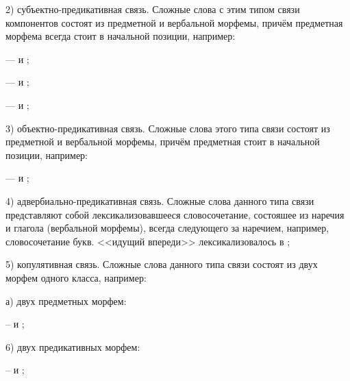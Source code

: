 2) субъектно-предикативная связь. Сложные слова с этим типом связи компонентов состоят из предметной и вербальной морфемы, причём предметная морфема всегда стоит в начальной позиции, например:
\begin{prfsample}
    \item {} ---  и ;
    \item {} ---  и ;
    \item {} ---  и ;
\end{prfsample}

3) объектно-предикативная связь. Сложные слова этого типа связи состоят из предметной и вербальной морфемы, причём предметная стоит в начальной позиции, например:
\begin{prfsample}
    \item {} ---  и ;    
\end{prfsample}

4) адвербиально-предикативная связь. Сложные слова данного типа связи представляют собой лексикализовавшееся словосочетание, состояшее из наречия и глагола (вербальной морфемы), всегда следующего за наречием, например, словосочетание  букв. <<идущий впереди>> лексикализовалось в ;

5) копулятивная связь. Сложные слова данного типа связи состоят из двух морфем одного класса, например:

а) двух предметных морфем:
\begin{prfsample}
    \item {} --  и ; 
\end{prfsample}

6) двух предикативных морфем:
\begin{prfsample}
    \item {} --  и ;
\end{prfsample}

